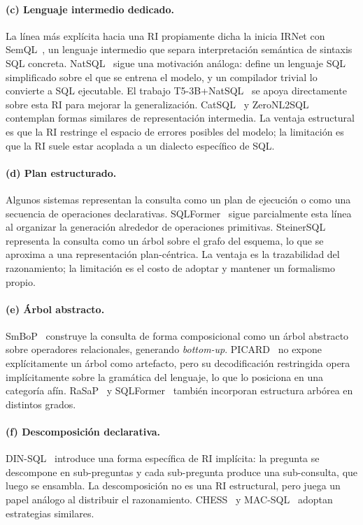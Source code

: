 \paragraph{(c) Lenguaje intermedio dedicado.} La línea más explícita
hacia una RI propiamente dicha la inicia IRNet con SemQL~\cite{guo2019irnet}, un
lenguaje intermedio que separa interpretación semántica de sintaxis SQL
concreta. NatSQL~\cite{gan2021natsql} sigue una motivación análoga:
define un lenguaje SQL simplificado sobre el que se entrena el modelo, y
un compilador trivial lo convierte a SQL ejecutable. El trabajo
T5-3B+NatSQL~\cite{T5-3B+NatSQL+TokenPreprocessing2023} se apoya
directamente sobre esta \ac{RI} para mejorar la generalización. CatSQL~\cite{CatSQL2023} y ZeroNL2SQL~\cite{ZeroNL2SQL2024}
contemplan formas similares de representación intermedia. La ventaja
estructural es que la RI restringe el espacio de errores posibles del
modelo; la limitación es que la RI suele estar acoplada a un dialecto
específico de SQL.

\paragraph{(d) Plan estructurado.} Algunos sistemas representan la
consulta como un plan de ejecución o como una secuencia de operaciones
declarativas. SQLFormer~\cite{SQLFormer2023} sigue parcialmente esta
línea al organizar la generación alrededor de operaciones primitivas.
SteinerSQL~\cite{SteinerSQL2025} representa la consulta como un árbol
sobre el grafo del esquema, lo que se aproxima a una representación
plan-céntrica. La ventaja es la trazabilidad del razonamiento; la
limitación es el costo de adoptar y mantener un formalismo propio.

\paragraph{(e) Árbol abstracto.} SmBoP~\cite{SmBoP2021} construye la
consulta de forma composicional como un árbol abstracto sobre operadores
relacionales, generando \emph{bottom-up}. PICARD~\cite{PICARD2022} no
expone explícitamente un árbol como artefacto, pero su decodificación
restringida opera implícitamente sobre la gramática del lenguaje, lo
que lo posiciona en una categoría afín. RaSaP~\cite{RaSaP2021} y
SQLFormer~\cite{SQLFormer2023} también incorporan estructura arbórea en
distintos grados.

\paragraph{(f) Descomposición declarativa.}
DIN-SQL~\cite{DIN-SQL2023} introduce una forma específica de RI
implícita: la pregunta se descompone en sub-preguntas y cada
sub-pregunta produce una sub-consulta, que luego se ensambla. La
descomposición no es una RI estructural, pero juega un papel análogo al
distribuir el razonamiento. CHESS~\cite{CHESS2024} y
MAC-SQL~\cite{MAC-SQL2023} adoptan estrategias similares.

